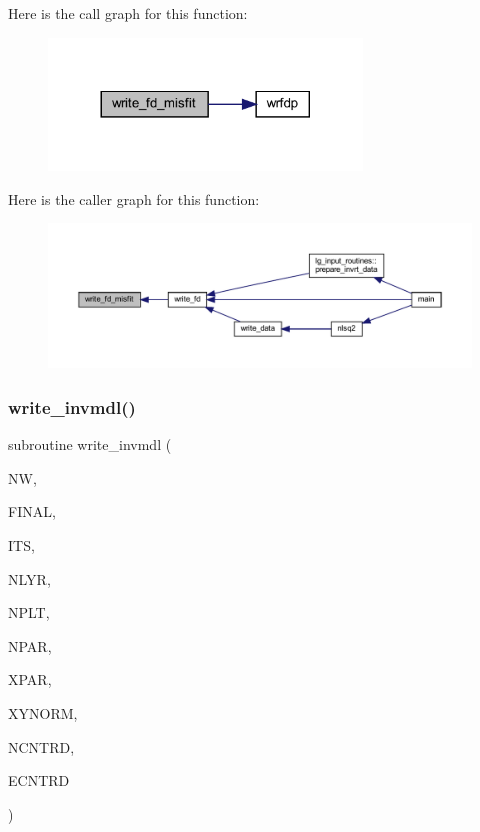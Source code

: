Here is the call graph for this function\+:\nopagebreak
\begin{figure}[H]
\begin{center}
\leavevmode
\includegraphics[width=236pt]{Leroi_8f90_a099fdc373643714db817e823ef93b622_cgraph}
\end{center}
\end{figure}
Here is the caller graph for this function\+:\nopagebreak
\begin{figure}[H]
\begin{center}
\leavevmode
\includegraphics[width=350pt]{Leroi_8f90_a099fdc373643714db817e823ef93b622_icgraph}
\end{center}
\end{figure}
\mbox{\label{Leroi_8f90_a6e7ea94365af1aa0e4cf97b842e24cf6}} 
\subsubsection{\texorpdfstring{write\+\_\+invmdl()}{write\_invmdl()}}
{\footnotesize\ttfamily subroutine write\+\_\+invmdl (\begin{DoxyParamCaption}\item[{integer}]{NW,  }\item[{logical}]{F\+I\+N\+AL,  }\item[{integer}]{I\+TS,  }\item[{integer}]{N\+L\+YR,  }\item[{integer}]{N\+P\+LT,  }\item[{integer}]{N\+P\+AR,  }\item[{real, dimension(npar)}]{X\+P\+AR,  }\item[{real, dimension(nplt)}]{X\+Y\+N\+O\+RM,  }\item[{real(kind=ql)}]{N\+C\+N\+T\+RD,  }\item[{real(kind=ql)}]{E\+C\+N\+T\+RD }\end{DoxyParamCaption})}


